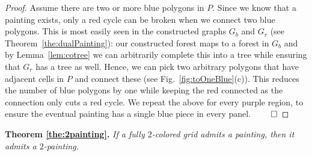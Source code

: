 \documentclass[runningheads]{llncs}
\newcommand{\cloneclaim}[2]{\medskip\noindent\textbf{#1.} \emph{#2}\smallskip}
\begin{document}
\begin{proof}
    Assume there are two or more blue polygons in $P$.
    Since we know that a painting exists, only a red cycle can be broken when we connect two blue polygons.
    This is most easily seen in the constructed graphs $G_b$ and $G_r$ (see Theorem~\ref{the:dualPainting}): our constructed forest maps to a forest in $G_b$ and by Lemma~\ref{lem:cotree} we can arbitrarily complete this into a tree while ensuring that $G_r$ has a tree as well.
    Hence, we can pick two arbitrary polygons that have adjacent cells in $P$ and connect these (see Fig.~\ref{fig:toOneBlue}(c)).
    This reduces the number of blue polygons by one while keeping the red connected as the connection only cuts a red cycle.
    We repeat the above for every purple region, to ensure the eventual painting has a single blue piece in every panel.
	\hfill$\qed$
\end{proof}

\cloneclaim{Theorem \ref{the:2painting}}{If a fully $2$-colored grid admits a painting, then it admits a $2$-painting.}
\end{document}
